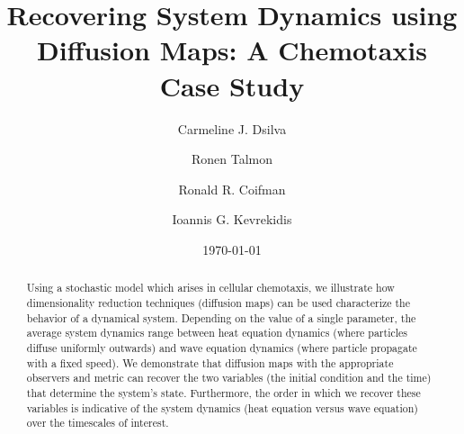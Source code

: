 \documentclass[prl, reprint, final, showkeys]{revtex4-1}
\begin{document}
\title{Recovering System Dynamics using Diffusion Maps: A Chemotaxis Case Study}

\author{Carmeline J. Dsilva}

\author{Ronen Talmon}

\author{Ronald R. Coifman}

\author{Ioannis G. Kevrekidis}

\date{\today}

\begin{abstract}

Using a stochastic model which arises in cellular chemotaxis, we illustrate how dimensionality reduction techniques (diffusion maps) can be used characterize the behavior of a dynamical system.
%
Depending on the value of a single parameter, the average system dynamics range between heat equation dynamics (where particles diffuse uniformly outwards) and wave equation dynamics (where particle propagate with a fixed speed). 
%
We demonstrate that diffusion maps with the appropriate observers and metric can recover the two variables (the initial condition and the time) that determine the system's state. 
%
Furthermore, the order in which we recover these variables is indicative of the system dynamics (heat equation versus wave equation) over the timescales of interest.
%
%
%
%	
%

\end{abstract}
\end{document}
